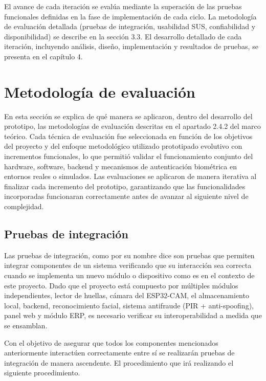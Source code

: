 \documentclass{iccmemoria}
\begin{document}
El avance de cada iteración se evalúa mediante la superación de las pruebas funcionales definidas en la fase de implementación de cada ciclo. La metodología de evaluación detallada (pruebas de integración, usabilidad SUS, confiabilidad y disponibilidad) se describe en la sección 3.3. El desarrollo detallado de cada iteración, incluyendo análisis, diseño, implementación y resultados de pruebas, se presenta en el capítulo 4.

\section{Metodología de evaluación}
En esta sección se explica de qué manera se aplicaron, dentro del desarrollo del prototipo, las metodologías de evaluación descritas en el apartado 2.4.2 del marco teórico. Cada técnica de evaluación fue seleccionada en función de los objetivos del proyecto y del enfoque metodológico utilizado prototipado evolutivo con incrementos funcionales, lo que permitió validar el funcionamiento conjunto del hardware, software, backend y mecanismos de autenticación biométrica en entornos reales o simulados. Las evaluaciones se aplicaron de manera iterativa al finalizar cada incremento del prototipo, garantizando que las funcionalidades incorporadas funcionaran correctamente antes de avanzar al siguiente nivel de complejidad.
\subsection{Pruebas de integración}
Las pruebas de integración, como por su nombre dice son pruebas que permiten integrar componentes de un sistema verificando que su interacción sea correcta cuando se implementa un nuevo módulo o dispositivo como es en el contexto de este proyecto. Dado que el proyecto está compuesto por múltiples módulos independientes, lector de huellas, cámara del ESP32-CAM, el almacenamiento local, backend, reconocimiento facial, sistema antifraude (PIR + anti-spoofing), panel web y módulo ERP, es necesario verificar su interoperabilidad a medida que se ensamblan.

Con el objetivo de asegurar que todos los componentes mencionados anteriormente interactúen correctamente entre sí se realizarán pruebas de integración de manera ascendente. El procedimiento que irá realizando el siguiente procedimiento.
\end{document}
